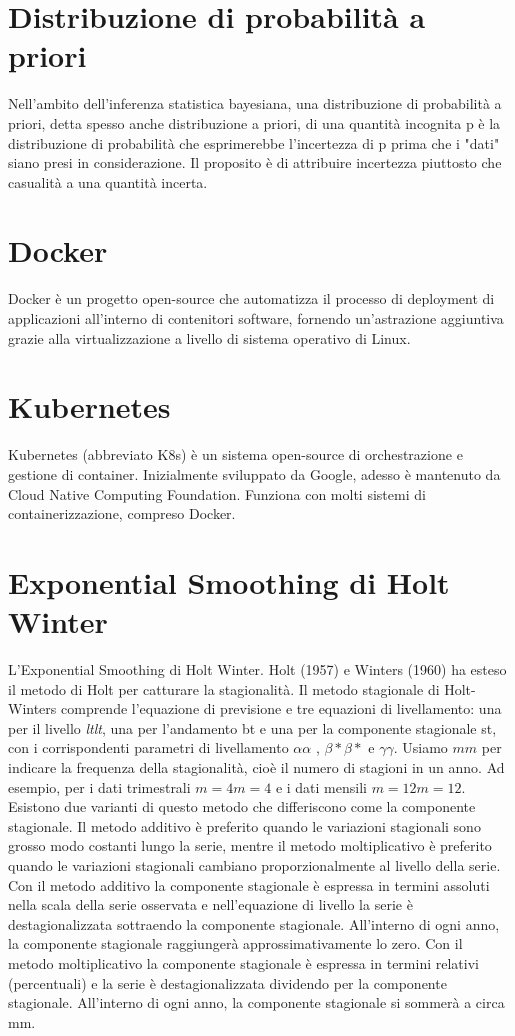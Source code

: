 \documentclass[12pt,a4paper]{report}
\begin{document}
\section*{Distribuzione di probabilità a priori}
\label{appendix:prior}
Nell'ambito dell'inferenza statistica bayesiana, una distribuzione di probabilità a priori, detta spesso anche distribuzione a priori, di una quantità incognita p è la distribuzione di probabilità che esprimerebbe l'incertezza di p prima che i "dati" siano presi in considerazione. Il proposito è di attribuire incertezza piuttosto che casualità a una quantità incerta.

\section*{Docker}
\label{appendix:Docker}
Docker è un progetto open-source che automatizza il processo di deployment di applicazioni all'interno di contenitori software, fornendo un'astrazione aggiuntiva grazie alla virtualizzazione a livello di sistema operativo di Linux.\cite{itwiki:123095653}

\section*{Kubernetes}
\label{appendix:Kubernetes}
Kubernetes (abbreviato K8s) è un sistema open-source di orchestrazione e gestione di container. Inizialmente sviluppato da Google, adesso è mantenuto da Cloud Native Computing Foundation. Funziona con molti sistemi di containerizzazione, compreso Docker.\cite{itwiki:119581182}

\section*{Exponential Smoothing di Holt Winter}
\label{appendix:ETS}
L'Exponential Smoothing di Holt Winter. Holt (1957) e Winters (1960) ha esteso il metodo di Holt per catturare la stagionalità. Il metodo stagionale di Holt- Winters comprende l'equazione di previsione e tre equazioni di livellamento: una per il livello \textit{ltlt}, una per l'andamento bt e una per la componente stagionale st, con i corrispondenti parametri di livellamento $\alpha\alpha$ , $\beta*\beta*$ e $\gamma\gamma$. Usiamo $mm$ per indicare la frequenza della stagionalità, cioè il numero di stagioni in un anno. Ad esempio, per i dati trimestrali $m=4m=4$ e i dati mensili $m=12m=12$.
Esistono due varianti di questo metodo che differiscono come la componente stagionale. Il metodo additivo è preferito quando le variazioni stagionali sono grosso modo costanti lungo la serie, mentre il metodo moltiplicativo è preferito quando le variazioni stagionali cambiano proporzionalmente al livello della serie. Con il metodo additivo la componente stagionale è espressa in termini assoluti nella scala della serie osservata e nell'equazione di livello la serie è destagionalizzata sottraendo la componente stagionale. All'interno di ogni anno, la componente stagionale raggiungerà approssimativamente lo zero. Con il metodo moltiplicativo la componente stagionale è espressa in termini relativi (percentuali) e la serie è destagionalizzata dividendo per la componente stagionale. All'interno di ogni anno, la componente stagionale si sommerà a circa mm.
\end{document}
